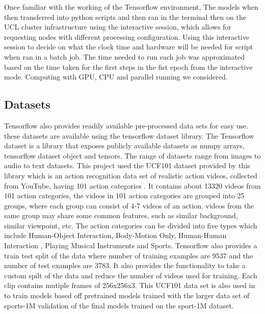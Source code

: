 \documentclass[10pt,phd,a4paper,oneside]{article}
\begin{document}
    Once familiar with the working of the Tensorflow environment, The models when then transferred into python scripts and then ran in the terminal then on the UCL cluster infrastructure using the interactive session, which allows for requesting nodes with different processing configuration. Using this interactive session to decide on what the clock time and hardware will be needed for script when ran in a batch job. The time needed to run each job was approximated based on the time taken for the first steps in the fist epoch from the interactive mode. Computing with GPU, CPU and parallel running we considered.


    \subsection{Datasets}
    Tensorflow also provides readily available pre-processed data sets for easy use. these datasets are available using the tensorflow dataset library. The Tensorflow dataset is a library that exposes publicly available datasets as numpy arrays, tensorflow dataset object and tensors. The range of datasets range from images to audio to text datasets.
    This project used the UCF101 dataset provided by this library which is an action recognition data set of realistic action videos, collected from YouTube, having 101 action categories \cite{soomro2012ucf101}. It contains about 13320 videos from 101 action categories, the videos in 101 action categories are grouped into 25 groups, where each group can consist of 4-7 videos of an action, videos from the same group may share some common features, such as similar background, similar viewpoint, etc.
    The action categories can be divided into five types which include Human-Object Interaction, Body-Motion Only, Human-Human Interaction , Playing Musical Instruments and Sports.
    Tensorflow also provides a train test split of the data where number of training examples are 9537 and the number of test examples are 3783.
    It also provides the functionality to take a custom spilt of the data and reduce the number of videos used for training. Each clip contains mutiple frames of 256x256x3.
    This UCF101 data set is also used in \citep{KarpathyCVPR14} to train models based off pretrained models trained with the larger data set of sports-1M  validation of the final models trained on the sport-1M dataset.
\end{document}

